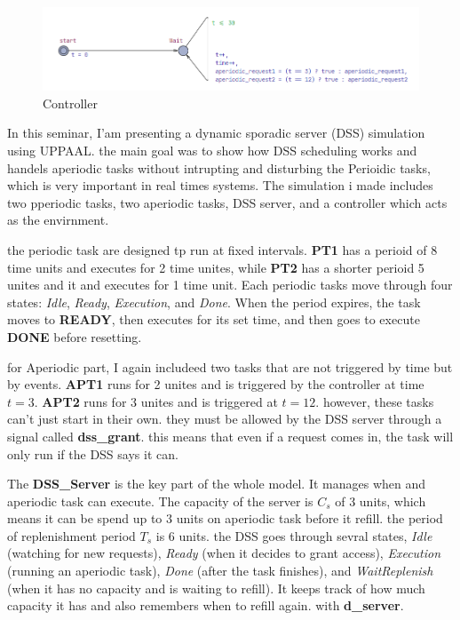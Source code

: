 \documentclass[conference]{IEEEtran}
\begin{document}
\begin{figure}
    \centering
    \includegraphics[width=1\linewidth]{Controller.png}
    \caption{Controller}
    \label{fig:enter-label}
\end{figure}
 
In this seminar, I'am presenting a dynamic sporadic server (DSS) simulation using UPPAAL. the main goal was to show how DSS scheduling works and handels aperiodic tasks without intrupting and disturbing the Perioidic tasks, which is very important in real times systems. The simulation i made includes two pperiodic tasks, two aperiodic tasks, DSS server, and a controller which acts as the envirnment.

the periodic task are designed tp run at fixed intervals. \textbf{PT1} has a perioid of 8 time units and executes for 2 time unites, while \textbf{PT2} has a shorter perioid 5 unites and it and executes for 1 time unit. Each periodic tasks move through four states: \textit{Idle}, \textit{Ready}, \textit{Execution}, and \textit{Done}. When the period expires, the task moves to  \textbf{READY}, then executes for its set time, and then goes to execute \textbf{DONE} before resetting. 

for Aperiodic part, I again includeed two tasks that are not triggered by time but by events. \textbf{APT1} runs for 2 unites and is triggered by the controller at time $t=3$. \textbf{APT2} runs for 3 unites and is triggered at $t = 12$. however, these tasks can't just start in their own. they must be allowed by the DSS server through a signal called \textbf{dss\_grant}. this means that even if a request comes in, the task will only run if the DSS says it can.

The \textbf{DSS\_Server} is the key part of the whole model. It manages when and aperiodic task can execute. The capacity of the server is $C_s$ of 3 units, which means it can be spend up to 3 units on aperiodic task before it refill. the period of replenishment period $T_s$ is 6 units. the DSS goes through sevral states, \textit{Idle} (watching for new requests), \textit{Ready} (when it decides to grant access), \textit{Execution} (running an aperiodic task), \textit{Done} (after the task finishes), and \textit{WaitReplenish} (when it has no capacity and is waiting to refill). It keeps track of how much capacity it has and also remembers when to refill again. with \textbf{d\_server}.
\end{document}
